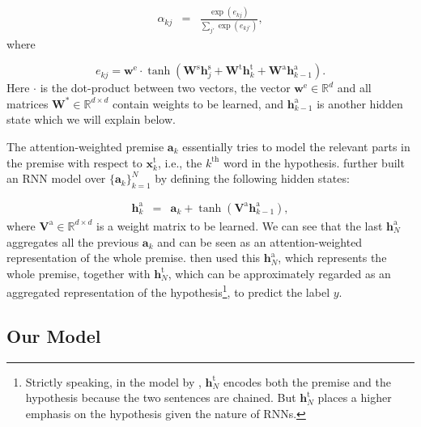 \documentclass[11pt,letterpaper]{article}
\begin{document}
\small
\begin{eqnarray}
\alpha_{kj} & = & \frac{\exp(e_{kj})}{\sum_{j'} \exp(e_{kj'})},
\end{eqnarray}
\normalsize
where 

\small
\begin{equation}
\label{eqn:e_kj}
e_{kj} = \mathbf{w}^\text{e} \cdot \tanh(\mathbf{W}^\text{s} \mathbf{h}^\text{s}_j + \mathbf{W}^\text{t} \mathbf{h}^\text{t}_k + \mathbf{W}^\text{a} \mathbf{h}^\text{a}_{k-1}).
\end{equation}
\normalsize
Here $\cdot$ is the dot-product between two vectors, the vector $\mathbf{w}^\text{e} \in \mathbb{R}^d$ and all matrices $\mathbf{W}^\text{*} \in \mathbb{R}^{d \times d}$ contain weights to be learned, and $\mathbf{h}^\text{a}_{k-1}$ is another hidden state which we will explain below.

The attention-weighted premise $\mathbf{a}_k$ essentially tries to model the relevant parts in the premise with respect to $\mathbf{x}^\text{t}_k$, i.e., the $k^{\mathrm{th}}$ word in the hypothesis.
 further built an RNN model over $\{\mathbf{a}_k\}_{k=1}^N$ by defining the following hidden states:

\small
\begin{eqnarray}
\mathbf{h}^\text{a}_k & = & \mathbf{a}_k + \tanh(\mathbf{V}^\text{a} \mathbf{h}^\text{a}_{k-1}),
\end{eqnarray}
\normalsize
where $\mathbf{V}^\text{a} \in \mathbb{R}^{d \times d}$ is a weight matrix to be learned.
We can see that the last $\mathbf{h}^\text{a}_N$ aggregates all the previous $\mathbf{a}_k$ and can be seen as an attention-weighted representation of the whole premise.
 then used this $\mathbf{h}^\text{a}_N$, which represents the whole premise, together with $\mathbf{h}^\text{t}_N$, which can be approximately regarded as an aggregated representation of the hypothesis\footnote{Strictly speaking, in the model by , $\mathbf{h}^\text{t}_N$ encodes both the premise and the hypothesis because the two sentences are chained. But $\mathbf{h}^\text{t}_N$ places a higher emphasis on the hypothesis given the nature of RNNs.},
to predict the label $y$.

\subsection{Our Model}
\end{document}
